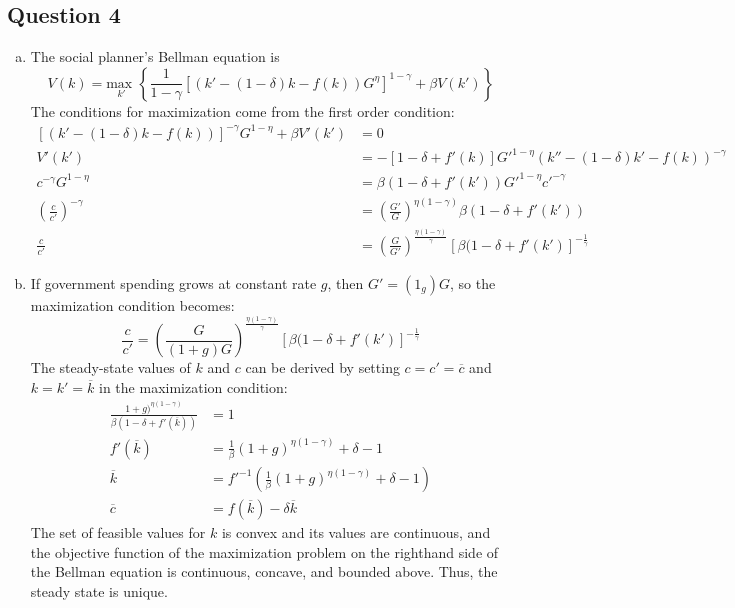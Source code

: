 \documentclass{article}
\newcommand{\usmax}[1]{\underset{#1}{\text{max }}}
\begin{document}
\pagebreak
\subsection*{Question 4}

\begin{enumerate}[(a)]
	\item The social planner's Bellman equation is
		\[
			V(k) = \usmax{k'}\left\{\frac{1}{1-\gamma}\left[(k'-(1-\delta)k-f(k))G^\eta\right]^{1-\gamma} + \beta V(k')\right\}
		\]
		The conditions for maximization come from the first order condition:
		\begin{align*}
			\left[\left(k'-(1-\delta)k-f(k)\right)\right]^{-\gamma}G^{1-\eta}+\beta V'(k') &= 0	\\
			V'(k') &= -\left[1-\delta+f'(k)\right]G'^{1-\eta}\left(k''-(1-\delta)k'-f(k)\right)^{-\gamma}	\\
			c^{-\gamma}G^{1-\eta} &= \beta(1-\delta + f'(k'))G'^{1-\eta}c'^{-\gamma}	\\
			\left(\frac{c}{c'}\right)^{-\gamma} &= \left(\frac{G'}{G}\right)^{\eta(1-\gamma)}\beta\left(1-\delta+f'(k')\right)	\\
			\frac{c}{c'} &= \left(\frac{G}{G'}\right)^{\frac{\eta(1-\gamma)}{\gamma}}\left[\beta(1-\delta+f'(k')\right]^{-\frac{1}{\gamma}}
		\end{align*}
	
	\item If government spending grows at constant rate $g$, then $G'=(1_g)G$, so the maximization condition becomes:
		\[
			\frac{c}{c'} = \left(\frac{G}{(1+g)G}\right)^{\frac{\eta(1-\gamma)}{\gamma}}\left[\beta(1-\delta+f'(k')\right]^{-\frac{1}{\gamma}}
		\]
		The steady-state values of $k$ and $c$ can be derived by setting ${c=c'=\overline{c}}$ and ${k=k'=\overline{k}}$ in the maximization condition:
		\begin{align*}
			\frac{1+g)^{\eta(1-\gamma)}}{\beta(1-\delta+f'(\overline{k}))} &= 1	\\
			f'(\overline{k}) &= \frac{1}{\beta}(1+g)^{\eta(1-\gamma)}+\delta-1	\\
			\overline{k} &= f'^{-1}\left(\frac{1}{\beta}(1+g)^{\eta(1-\gamma)}+\delta-1\right)	\\
			\overline{c} &= f(\overline{k})-\delta\overline{k}
		\end{align*}
		The set of feasible values for $k$ is convex and its values are continuous, and the objective function of the maximization problem on the righthand side of the Bellman equation is continuous, concave, and bounded above. Thus, the steady state is unique.
	

\end{enumerate}
\end{document}
